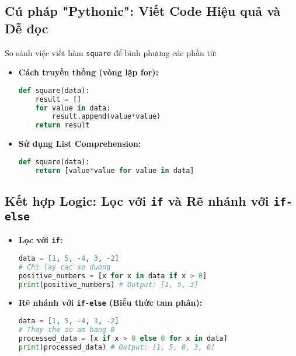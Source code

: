 \documentclass[11pt]{article}
\begin{document}
\subsection{Cú pháp "Pythonic": Viết Code Hiệu quả và Dễ đọc}
So sánh việc viết hàm \texttt{square} để bình phương các phần tử:
\begin{itemize}
    \item \textbf{Cách truyền thống (vòng lặp for):}
    \begin{lstlisting}[language=Python]
def square(data):
    result = []
    for value in data:
        result.append(value*value)
    return result
    \end{lstlisting}
    \item \textbf{Sử dụng List Comprehension:}
    \begin{lstlisting}[language=Python]
def square(data):
    return [value*value for value in data]
    \end{lstlisting}
\end{itemize}

\subsection{Kết hợp Logic: Lọc với \texttt{if} và Rẽ nhánh với \texttt{if-else}}
\begin{itemize}
    \item \textbf{Lọc với \texttt{if}:}
    \begin{lstlisting}[language=Python]
data = [1, 5, -4, 3, -2]
# Chi lay cac so duong
positive_numbers = [x for x in data if x > 0]
print(positive_numbers) # Output: [1, 5, 3]
    \end{lstlisting}
    \item \textbf{Rẽ nhánh với \texttt{if-else} (Biểu thức tam phân):}
    \begin{lstlisting}[language=Python]
data = [1, 5, -4, 3, -2]
# Thay the so am bang 0
processed_data = [x if x > 0 else 0 for x in data]
print(processed_data) # Output: [1, 5, 0, 3, 0]
    \end{lstlisting}
\end{itemize}
\end{document}
